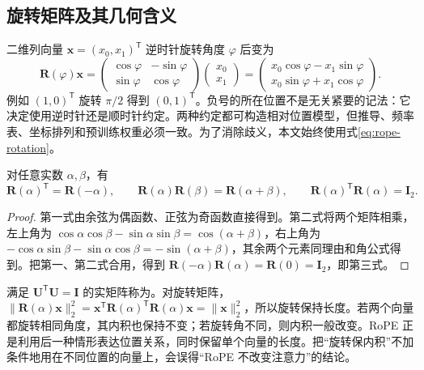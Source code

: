 \documentclass[UTF8,12pt,a4paper,fontset=fandol]{ctexart}
\begin{document}
\subsection{旋转矩阵及其几何含义}
二维列向量 $\mathbf x=(x_0,x_1)^{\mathsf T}$ 逆时针旋转角度 $\varphi$ 后变为
\begin{equation}
\mathbf R(\varphi)\mathbf x=
\begin{pmatrix}\cos\varphi&-\sin\varphi\\
\sin\varphi&\cos\varphi\end{pmatrix}
\begin{pmatrix}x_0\\x_1\end{pmatrix}
=\begin{pmatrix}x_0\cos\varphi-x_1\sin\varphi\\
x_0\sin\varphi+x_1\cos\varphi\end{pmatrix}.
\label{eq:rope-rotation}
\end{equation}
例如 $(1,0)^{\mathsf T}$ 旋转 $\pi/2$ 得到 $(0,1)^{\mathsf T}$。负号的所在位置不是无关紧要的记法：它决定使用逆时针还是顺时针约定。两种约定都可构造相对位置模型，但推导、频率表、坐标排列和预训练权重必须一致。为了消除歧义，本文始终使用式\eqref{eq:rope-rotation}。

\begin{proposition}[旋转的三个恒等式]
对任意实数 $\alpha,\beta$，有
\begin{equation}
\mathbf R(\alpha)^{\mathsf T}=\mathbf R(-\alpha),\qquad
\mathbf R(\alpha)\mathbf R(\beta)=\mathbf R(\alpha+\beta),\qquad
\mathbf R(\alpha)^{\mathsf T}\mathbf R(\alpha)=\mathbf I_2.
\label{eq:rope-group}
\end{equation}
\end{proposition}
\begin{proof}
第一式由余弦为偶函数、正弦为奇函数直接得到。第二式将两个矩阵相乘，左上角为 $\cos\alpha\cos\beta-\sin\alpha\sin\beta=\cos(\alpha+\beta)$，右上角为 $-\cos\alpha\sin\beta-\sin\alpha\cos\beta=-\sin(\alpha+\beta)$，其余两个元素同理由和角公式得到。把第一、第二式合用，得到 $\mathbf R(-\alpha)\mathbf R(\alpha)=\mathbf R(0)=\mathbf I_2$，即第三式。
\end{proof}

满足 $\mathbf U^{\mathsf T}\mathbf U=\mathbf I$ 的实矩阵称为。对旋转矩阵，$\|\mathbf R(\alpha)\mathbf x\|_2^2=\mathbf x^{\mathsf T}\mathbf R(\alpha)^{\mathsf T}\mathbf R(\alpha)\mathbf x=\|\mathbf x\|_2^2$，所以旋转保持长度。若两个向量都旋转相同角度，其内积也保持不变；若旋转角不同，则内积一般改变。RoPE 正是利用后一种情形表达位置关系，同时保留单个向量的长度。把“旋转保内积”不加条件地用在不同位置的向量上，会误得“RoPE 不改变注意力”的结论。
\end{document}

